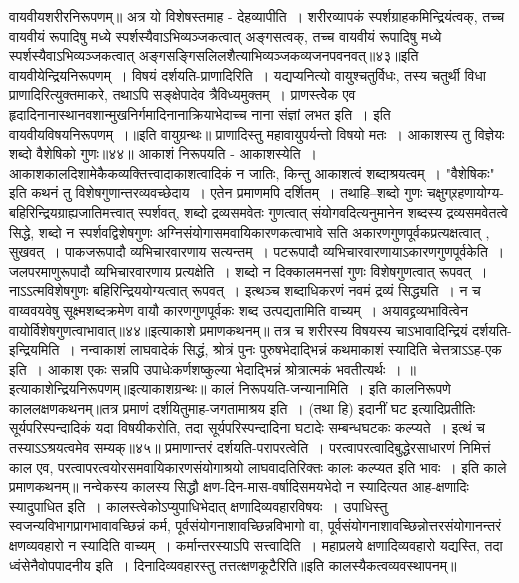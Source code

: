 वायवीयशरीरनिरूपणम्॥
अत्र यो विशेषस्तमाह - देहव्यापीति~। शरीरव्यापकं स्पर्शग्राहकमिन्द्रियंत्वक्, तच्च वायवीयं रूपादिषु मध्ये स्पर्शस्यैवाऽभिव्यञ्जकत्वात् अङ्गसत्वक्, तच्च
वायवीयं रूपादिषु मध्ये स्पर्शस्यैवाऽभिव्यञ्जकत्वात् अङ्गसङ्गिसलिलशैत्याभिव्यञ्जकव्यजनपवनवत्॥४३॥इति वायवीयेन्द्रियनिरूपणम्~।
विषयं दर्शयति-प्राणादिरिति~। यद्यप्यनित्यो वायुश्चतुर्विधः, तस्य चतुर्थी विधा प्राणादिरित्युक्तमाकरे, तथाऽपि सङ्क्षेपादेव त्रैविध्यमुक्तम्~। प्राणस्त्वेेक एव
हृदादिनानास्थानवशान्मुखनिर्गमादिनानाक्रियाभेदाच्च नाना संज्ञां लभत इति~।
इति वायवीयविषयनिरूपणम्~।॥इति वायुग्रन्थः॥
प्राणादिस्तु महावायुपर्यन्तो विषयो मतः~।
आकाशस्य तु विज्ञेयः शब्दो वैशेषिको गुणः॥४४॥
आकाशं निरूपयति - आकाशस्येति~। आकाशकालदिशामेकैकव्यक्तित्त्वादाकाशत्वादिकं न जातिः, किन्तु आकाशत्वं शब्दाश्रयत्वम्~। "वैशेषिकः" इति कथनं तु
विशेषगुणान्तरव्यवच्छेदाय~।
एतेन प्रमाणमपि दर्शितम्~। तथाहि--शब्दो गुणः चक्षुग्र्रहणायोग्य-बहिरिन्द्रियग्राह्यजातिमत्त्वात् स्पर्शवत्, शब्दो द्रव्यसमवेतः गुणत्वात् संयोगवदित्यनुमानेन शब्दस्य
द्रव्यसमवेतत्वे सिद्धे, शब्दो न स्पर्शवद्विशेषगुणः अग्निसंयोगासमवायिकारणकत्वाभावे सति अकारणगुणपूर्वकप्रत्यक्षत्वात् , सुखवत्~। पाकजरूपादौ व्यभिचारवारणाय
सत्यन्तम्~। पटरूपादौ व्यभिचारवारणायाऽकारणगुणपूर्वकेति~। जलपरमाणुरूपादौ व्यभिचारवारणाय प्रत्यक्षेति~। शब्दो न दिक्कालमनसां गुणः विशेषगुणत्वात् रूपवत्~।
नाऽऽत्मविशेषगुणः बहिरिन्द्रिययोग्यत्वात् रूपवत्~। इत्थञ्च शब्दाधिकरणं नवमं द्रव्यं सिद्ध्यति~। न च वाय्ववयवेषु सूक्ष्मशब्दक्रमेण वायौ कारणगुणपूर्वकः शब्द
उत्पद्यतामिति वाच्यम्~। अयावद्द्रव्यभावित्वेन वायोर्विशेषगुणत्वाभावात्॥४४॥इत्याकाशे प्रमाणकथनम्॥
तत्र च शरीरस्य विषयस्य चाऽभावादिन्द्रियं दर्शयति-इन्द्रियमिति~। नन्वाकाशं लाघवादेकं सिद्धं, श्रोत्रं पुनः पुरुषभेदाद्भिन्नं कथमाकाशं स्यादिति चेत्तत्राऽऽह-एक
इति~। आकाश एकः सन्नपि उपाधेःकर्णशष्कुल्या भेदाद्भिन्नं श्रोत्रात्मकं भवतीत्यर्थः~।
॥इत्याकाशेन्द्रियनिरूपणम्॥इत्याकाशग्रन्थः॥
कालं निरूपयति-जन्यानामिति~। इति कालनिरूपणे काललक्षणकथनम्॥तत्र प्रमाणं दर्शयितुमाह-जगतामाश्रय इति~। (तथा हि) इदानीं घट इत्यादिप्रतीतिः
सूर्यपरिस्पन्दादिकं यदा विषयीकरोति, तदा सूर्यपरिस्पन्दादिना घटादेः सम्बन्धघटकः कल्प्यते~। इत्थं च तस्याऽऽश्रयत्वमेव सम्यक्॥४५॥
प्रमाणान्तरं दर्शयति-परापरत्वेति~। परत्वापरत्वादिबुद्धेरसाधारणं निमित्तं काल एव, परत्वापरत्वयोरसमवायिकारणसंयोगाश्रयो लाघवादतिरिक्तः कालः कल्प्यत
इति भावः~। इति काले प्रमाणकथनम्॥
नन्वेकस्य कालस्य सिद्धौ क्षण-दिन-मास-वर्षादिसमयभेदो न स्यादित्यत आह-क्षणादिः स्यादुपाधित इति~। कालस्त्वेकोऽप्युपाधिभेदात् क्षणादिव्यवहारविषयः~।
उपाधिस्तु स्वजन्यविभागप्रागभावावच्छिन्नं कर्म, पूर्वसंयोगनाशावच्छिन्नविभागो वा, पूर्वसंयोगनाशावच्छिन्नोत्तरसंयोगानन्तरं क्षणव्यवहारो न स्यादिति वाच्यम्~।
कर्मान्तरस्याऽपि सत्त्वादिति~। महाप्रलये क्षणादिव्यवहारो यद्यस्ति, तदा ध्वंसेनैवोपपादनीय इति~। दिनादिव्यवहारस्तु तत्तत्क्षणकूटैरिति॥इति कालस्यैकत्वव्यवस्थापनम्॥
